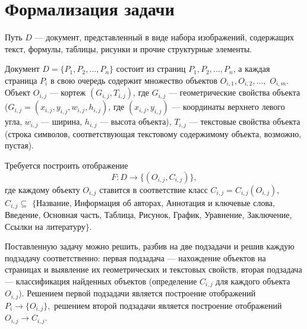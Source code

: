 \section{Формализация задачи}

Путь $ D $ --- документ, представленный в виде набора изображений, содержащих текст, формулы, таблицы, рисунки и прочие структурные элементы.

Документ $D = \{ P_1, P_2 , \dots, P_n \} $ состоит из страниц $ P_1, P_2, \dots, P_n $, а каждая страница
$ P_i $
в свою очередь содержит множество объектов $ O_{i,1}, O_{i,2}, \dots, $ $O_{i,m} $.
Объект $O_{i,j}$ --- кортеж $(G_{i,j}, T_{i,j})$, где $G_{i,j}$ --- геометрические свойства объекта ($G_{i,j} = (x_{i,j}, y_{i,j}, w_{i,j}, h_{i,j})$, где $(x_{i,j}, y_{i,j})$ --- координаты верхнего левого угла, $w_{i,j}$ --- ширина, $h_{i,j}$ --- высота объекта), $T_{i,j}$ --- текстовые свойства объекта (строка символов, соответствующая текстовому содержимому объекта, возможно, пустая).

Требуется построить отображение $$ F : D \to \{(O_{i,j}, C_{i,j})\}, $$ где каждому объекту $O_{i,j}$ ставится в соответствие класс $C_{i,j} = C_{i,j}(O_{i,j})$, $C_{i,j} \subseteq$ $\{${Название, Информация об авторах, Аннотация и ключевые слова, Введение, Основная часть, Таблица, Рисунок, График, Уравнение, Заключение, Ссылки на литературу}$\}$.

Поставленную задачу можно решить, разбив на две подзадачи и решив каждую подзадачу соответственно: первая подзадача --- нахождение объектов на страницах и выявление их геометрических и текстовых свойств, вторая подзадача --- классификация найденных объектов (определение $C_{i,j}$ для каждого объекта $O_{i,j}$).
Решением первой подзадачи является построение отображений
$
P_i \to \{ O_{i,j} \},
$
решением второй подзадачи является построение отображений
$
O_{i,j} \to C_{i,j}.
$

